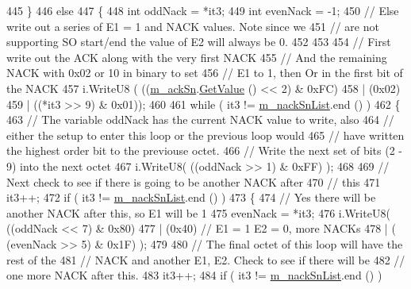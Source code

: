 \begin{DoxyCode}
445         \}
446       \textcolor{keywordflow}{else}
447         \{
448           \textcolor{keywordtype}{int} oddNack = *it3;
449           \textcolor{keywordtype}{int} evenNack = -1;
450           \textcolor{comment}{// Else write out a series of E1 = 1 and NACK values. Note since we}
451           \textcolor{comment}{// are not supporting SO start/end the value of E2 will always be 0.}
452 
453 
454           \textcolor{comment}{// First write out the ACK along with the very first NACK}
455           \textcolor{comment}{// And the remaining NACK with 0x02 or 10 in binary to set}
456           \textcolor{comment}{// E1 to 1, then Or in the first bit of the NACK}
457           i.WriteU8 ( ((\hyperlink{classns3_1_1LteRlcAmHeader_a95d8ee6ccdb69d68bd28c8a8f3257b1c}{m\_ackSn}.\hyperlink{classns3_1_1SequenceNumber10_a9dcaea04bc415e169e7e0020ce579d01}{GetValue} () << 2) & 0xFC)
458             | (0x02)
459             | ((*it3 >> 9) & 0x01));
460 
461           \textcolor{keywordflow}{while} ( it3 != \hyperlink{classns3_1_1LteRlcAmHeader_ae9feb3d09099ed90ed014d3f0fa8591b}{m\_nackSnList}.end () )
462             \{
463               \textcolor{comment}{// The variable oddNack has the current NACK value to write, also}
464               \textcolor{comment}{// either the setup to enter this loop or the previous loop would}
465               \textcolor{comment}{// have written the highest order bit to the previouse octet.}
466               \textcolor{comment}{// Write the next set of bits (2 - 9) into the next octet}
467               i.WriteU8( ((oddNack >> 1) & 0xFF) );
468 
469               \textcolor{comment}{// Next check to see if there is going to be another NACK after}
470               \textcolor{comment}{// this}
471               it3++;
472               \textcolor{keywordflow}{if} ( it3 != \hyperlink{classns3_1_1LteRlcAmHeader_ae9feb3d09099ed90ed014d3f0fa8591b}{m\_nackSnList}.end () )
473                 \{
474                   \textcolor{comment}{// Yes there will be another NACK after this, so E1 will be 1}
475                   evenNack = *it3;
476                   i.WriteU8( ((oddNack << 7) & 0x80)
477                    | (0x40)  \textcolor{comment}{// E1 = 1 E2 = 0, more NACKs}
478                    | ( (evenNack >> 5) & 0x1F) );
479 
480                   \textcolor{comment}{// The final octet of this loop will have the rest of the}
481                   \textcolor{comment}{// NACK and another E1, E2. Check to see if there will be}
482                   \textcolor{comment}{// one more NACK after this.}
483                   it3++;
484                   \textcolor{keywordflow}{if} ( it3 != \hyperlink{classns3_1_1LteRlcAmHeader_ae9feb3d09099ed90ed014d3f0fa8591b}{m\_nackSnList}.end () )

\end{DoxyCode}
